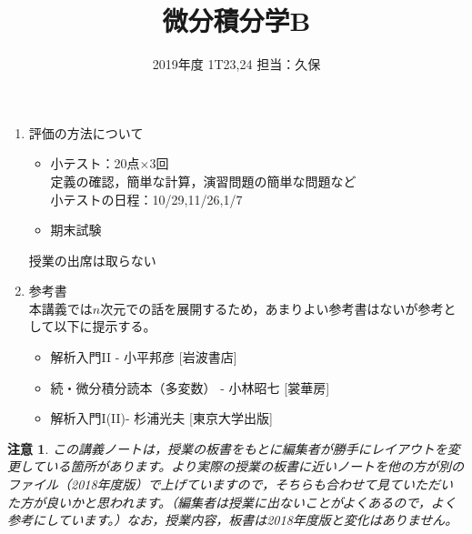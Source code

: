 \documentclass[dvipdfmx,a4j,10pt]{jsarticle}
\title{微分積分学B}
\author{2019年度 1T23,24 担当：久保}
\date{}
\theoremstyle{mystyle1}
\theoremstyle{mystyle2}
\newtheorem{note}{注意}
\begin{document}
\maketitle

\begin{enumerate}
\item 評価の方法について
	\begin{itemize}
		\item 小テスト：20点$\times$3回\\
			定義の確認，簡単な計算，演習問題の簡単な問題など\\
			小テストの日程：10/29,11/26,1/7
		\item 期末試験
	\end{itemize}
	授業の出席は取らない
\item 参考書\\
本講義では$n$次元での話を展開するため，あまりよい参考書はないが参考として以下に提示する。
	\begin{itemize}
		\item 解析入門II - 小平邦彦 [岩波書店]
		\item 続・微分積分読本（多変数） - 小林昭七 [裳華房]
		\item 解析入門I(II)- 杉浦光夫 [東京大学出版]
	\end{itemize}
\end{enumerate}

\begin{note}
	この講義ノートは，授業の板書をもとに編集者が勝手にレイアウトを変更している箇所があります。より実際の授業の板書に近いノートを他の方が別のファイル（2018年度版）で上げていますので，そちらも合わせて見ていただいた方が良いかと思われます。（編集者は授業に出ないことがよくあるので，よく参考にしています。）なお，授業内容，板書は2018年度版と変化はありません。
\end{note}

\newpage

\tableofcontents


















\end{document}
